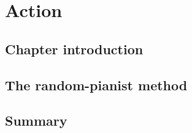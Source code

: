 \chapter{Action}
\section{Chapter introduction}
\section{The random-pianist method}
\section{Summary}
